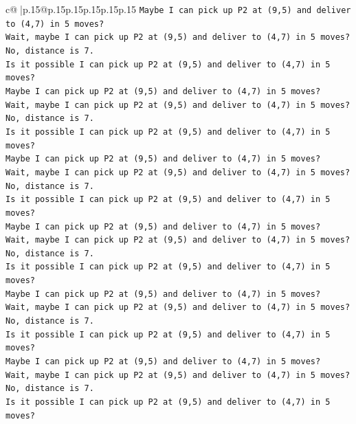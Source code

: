 \documentclass{article}
\begin{document}
{\begin{supertabular}{c@{$\;$}|p{.15\linewidth}@{}p{.15\linewidth}p{.15\linewidth}p{.15\linewidth}p{.15\linewidth}p{.15\linewidth}}
{{{\texttt{Maybe I can pick up P2 at (9,5) and deliver to (4,7) in 5 moves?} \\
\texttt{Wait, maybe I can pick up P2 at (9,5) and deliver to (4,7) in 5 moves?} \\
\texttt{No, distance is 7.} \\
\texttt{Is it possible I can pick up P2 at (9,5) and deliver to (4,7) in 5 moves?} \\
\texttt{Maybe I can pick up P2 at (9,5) and deliver to (4,7) in 5 moves?} \\
\texttt{Wait, maybe I can pick up P2 at (9,5) and deliver to (4,7) in 5 moves?} \\
\texttt{No, distance is 7.} \\
\texttt{Is it possible I can pick up P2 at (9,5) and deliver to (4,7) in 5 moves?} \\
\texttt{Maybe I can pick up P2 at (9,5) and deliver to (4,7) in 5 moves?} \\
\texttt{Wait, maybe I can pick up P2 at (9,5) and deliver to (4,7) in 5 moves?} \\
\texttt{No, distance is 7.} \\
\texttt{Is it possible I can pick up P2 at (9,5) and deliver to (4,7) in 5 moves?} \\
\texttt{Maybe I can pick up P2 at (9,5) and deliver to (4,7) in 5 moves?} \\
\texttt{Wait, maybe I can pick up P2 at (9,5) and deliver to (4,7) in 5 moves?} \\
\texttt{No, distance is 7.} \\
\texttt{Is it possible I can pick up P2 at (9,5) and deliver to (4,7) in 5 moves?} \\
\texttt{Maybe I can pick up P2 at (9,5) and deliver to (4,7) in 5 moves?} \\
\texttt{Wait, maybe I can pick up P2 at (9,5) and deliver to (4,7) in 5 moves?} \\
\texttt{No, distance is 7.} \\
\texttt{Is it possible I can pick up P2 at (9,5) and deliver to (4,7) in 5 moves?} \\
\texttt{Maybe I can pick up P2 at (9,5) and deliver to (4,7) in 5 moves?} \\
\texttt{Wait, maybe I can pick up P2 at (9,5) and deliver to (4,7) in 5 moves?} \\
\texttt{No, distance is 7.} \\
\texttt{Is it possible I can pick up P2 at (9,5) and deliver to (4,7) in 5 moves?} \\
}}}
\end{supertabular}}
\end{document}
